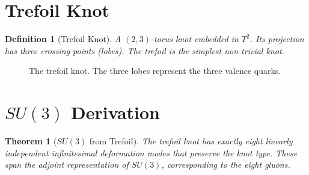 \documentclass[12pt,oneside]{book}
\newtheorem{definition}{Definition}[chapter]
\newtheorem{theorem}{Theorem}[chapter]
\begin{document}
\section{Trefoil Knot}

\begin{definition}[Trefoil Knot]
A $(2,3)$-torus knot embedded in $T^2$. Its projection has three crossing points (lobes). The trefoil is the simplest non-trivial knot.
\end{definition}

\begin{figure}[H]
\centering
{}
\caption{The trefoil knot. The three lobes represent the three valence quarks.}
\label{fig:trefoil}
\end{figure}

\section{$SU(3)$ Derivation}

\begin{theorem}[$SU(3)$ from Trefoil]
The trefoil knot has exactly eight linearly independent infinitesimal deformation modes that preserve the knot type. These span the adjoint representation of $SU(3)$, corresponding to the eight gluons.
\end{theorem}
\end{document}
